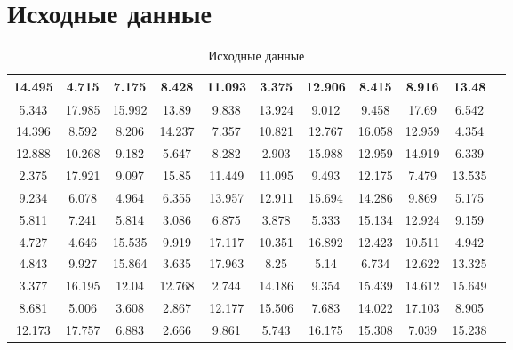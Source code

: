 \documentclass[a4paper, 14pt]{extarticle}
\begin{document}
\section{Исходные данные}

\begin{center}
    \begin{table}[h!]
        \begin{adjustbox}{max width=\textwidth}
            \begin{tabular}{|c|c|c|c|c|c|c|c|c|c|c|}
                \hline
                14.495 & 4.715 & 7.175 & 8.428 & 11.093 &
                3.375 & 12.906 & 8.415 & 8.916 & 13.48 \\
                \hline
                5.343 & 17.985 & 15.992 & 13.89 & 9.838 &
                13.924 & 9.012 & 9.458 & 17.69 & 6.542 \\
                \hline
                14.396 & 8.592 & 8.206 & 14.237 & 7.357 &
                10.821 & 12.767 & 16.058 & 12.959 & 4.354 \\
                \hline
                12.888 & 10.268 & 9.182 & 5.647 & 8.282 &
                2.903 & 15.988 & 12.959 & 14.919 & 6.339 \\
                \hline
                2.375 & 17.921 & 9.097 & 15.85 & 11.449 &
                11.095 & 9.493 & 12.175 & 7.479 & 13.535 \\
                \hline
                9.234 & 6.078 & 4.964 & 6.355 & 13.957 &
                12.911 & 15.694 & 14.286 & 9.869 & 5.175 \\
                \hline
                5.811 & 7.241 & 5.814 & 3.086 & 6.875 &
                3.878 & 5.333 & 15.134 & 12.924 & 9.159 \\
                \hline
                4.727 & 4.646 & 15.535 & 9.919 & 17.117 &
                10.351 & 16.892 & 12.423 & 10.511 & 4.942 \\
                \hline
                4.843 & 9.927 & 15.864 & 3.635 & 17.963 &
                8.25 & 5.14 & 6.734 & 12.622 & 13.325 \\
                \hline
                3.377 & 16.195 & 12.04 & 12.768 & 2.744 &
                14.186 & 9.354 & 15.439 & 14.612 & 15.649 \\
                \hline
                8.681 & 5.006 & 3.608 & 2.867 & 12.177 &
                15.506 & 7.683 & 14.022 & 17.103 & 8.905 \\
                \hline
                12.173 & 17.757 & 6.883 & 2.666 & 9.861 &
                5.743 & 16.175 & 15.308 & 7.039 & 15.238 \\
                \hline
            \end{tabular}
        \end{adjustbox}
        \caption{Исходные данные}
        \label{tab:data}
    \end{table}
\end{center}
\end{document}
